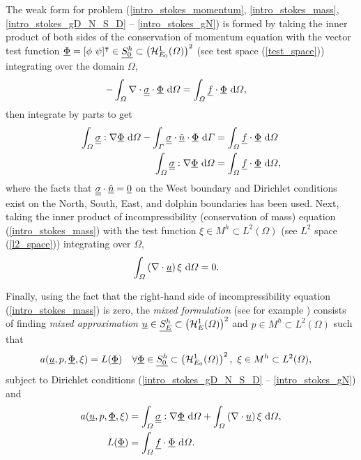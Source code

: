 The weak form for problem (\ref{intro_stokes_momentum}, \ref{intro_stokes_mass}, \ref{intro_stokes_gD_N_S_D} -- \ref{intro_stokes_gN}) is formed by taking the inner product of both sides of the conservation of momentum equation with the vector test function $\underline{\Phi} = [\phi\ \psi ]^\intercal \in \underline{S_0^h} \subset \left( \mathcal{H}_{E_0}^1(\varOmega) \right)^2$ (see test space (\ref{test_space})) integrating over the domain $\Omega$,
\begin{align*}
  -\int_{\varOmega} \nabla \cdot \underline{\underline{\sigma}} \cdot \underline{\Phi} \ \mathrm{d}\varOmega &= \int_{\varOmega} \underline{f} \cdot \underline{\Phi} \ \mathrm{d}\varOmega,
\end{align*}
then integrate by parts to get 
\begin{align*}
  \int_{\varOmega} \underline{\underline{\sigma}} : \nabla \underline{\Phi} \ \mathrm{d}\varOmega - \int_{\varGamma} \underline{\underline{\sigma}} \cdot \underline{\hat{n}} \cdot \underline{\Phi} \ \mathrm{d}\varGamma &= \int_{\varOmega} \underline{f} \cdot \underline{\Phi} \ \mathrm{d}\varOmega \\
  \int_{\varOmega} \underline{\underline{\sigma}} : \nabla \underline{\Phi} \ \mathrm{d}\varOmega &= \int_{\varOmega} \underline{f} \cdot \underline{\Phi} \ \mathrm{d}\varOmega,
\end{align*}
where the facts that $\underline{\underline{\sigma}} \cdot \underline{\hat{n}} = \underline{0}$ on the West boundary and Dirichlet conditions exist on the North, South, East, and dolphin boundaries has been used.  Next, taking the inner product of incompressibility (conservation of mass) equation (\ref{intro_stokes_mass}) with the test function $\xi \in M^h \subset L^2(\Omega)$ (see $L^2$ space (\ref{l2_space})) integrating over $\Omega$,
\begin{align*}
  \int_{\varOmega} \left( \nabla \cdot \underline{u} \right) \xi \ \mathrm{d}\varOmega &= 0.
\end{align*}

Finally, using the fact that the right-hand side of incompressibility equation (\ref{intro_stokes_mass}) is zero, the  \emph{mixed formulation} (see for example \citet{johnson_2009}) consists of finding \emph{mixed approximation} $\underline{u} \in \underline{S_E^h} \subset \left( \mathcal{H}_E^1(\varOmega) \right)^2$ and $p \in M^h \subset L^2(\Omega)$ such that
{\scriptsize
\begin{align}
  \label{intro_stokes_mixed_problem}
  a(\underline{u},p,\underline{\Phi},\xi) &= L(\underline{\Phi}) && \forall \underline{\Phi} \in \underline{S_0^h} \subset \left( \mathcal{H}_{E_0}^1(\varOmega) \right)^2,\ \xi \in M^h \subset L^2(\varOmega),
\end{align}}
subject to Dirichlet conditions (\ref{intro_stokes_gD_N_S_D} -- \ref{intro_stokes_gN}) and
\begin{align*}
  a(\underline{u},p,\underline{\Phi},\xi) &= \int_{\varOmega} \underline{\underline{\sigma}} : \nabla \underline{\Phi} \ \mathrm{d}\varOmega + \int_{\varOmega} \left( \nabla \cdot \underline{u} \right) \xi \ \mathrm{d}\varOmega, \\
  L(\underline{\Phi}) &= \int_{\varOmega} \underline{f} \cdot \underline{\Phi} \ \mathrm{d}\varOmega.
\end{align*}


